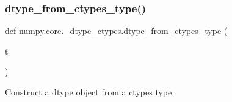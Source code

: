 \subsubsection{\texorpdfstring{dtype\+\_\+from\+\_\+ctypes\+\_\+type()}{dtype\_from\_ctypes\_type()}}
{\footnotesize\ttfamily def numpy.\+core.\+\_\+dtype\+\_\+ctypes.\+dtype\+\_\+from\+\_\+ctypes\+\_\+type (\begin{DoxyParamCaption}\item[{}]{t }\end{DoxyParamCaption})}

\begin{DoxyVerb}Construct a dtype object from a ctypes type
\end{DoxyVerb}
 